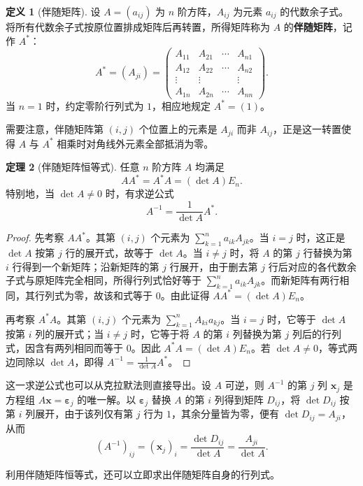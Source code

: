 \documentclass[UTF8, fontset=fandol, a4paper, 12pt]{ctexart}
\newcommand{\vx}{\boldsymbol{x}}
\newcommand{\ve}{\boldsymbol{\varepsilon}}
\theoremstyle{definition}
\newtheorem{definition}{定义}[section]
\newtheorem{theorem}[definition]{定理}
\begin{document}
\begin{definition}[伴随矩阵]
设 $A=(a_{ij})$ 为 $n$ 阶方阵，$A_{ij}$ 为元素 $a_{ij}$ 的代数余子式。将所有代数余子式按原位置排成矩阵后再转置，所得矩阵称为 $A$ 的\textbf{伴随矩阵}，记作 $A^*$：
\[
 A^*=(A_{ji})=
 \begin{pmatrix}
  A_{11}&A_{21}&\cdots&A_{n1}\\
  A_{12}&A_{22}&\cdots&A_{n2}\\
  \vdots&\vdots&&\vdots\\
  A_{1n}&A_{2n}&\cdots&A_{nn}
 \end{pmatrix}.
\]
当 $n=1$ 时，约定零阶行列式为 $1$，相应地规定 $A^*=(1)$。
\end{definition}

需要注意，伴随矩阵第 $(i,j)$ 个位置上的元素是 $A_{ji}$ 而非 $A_{ij}$，正是这一转置使得 $A$ 与 $A^*$ 相乘时对角线外元素全部抵消为零。

\begin{theorem}[伴随矩阵恒等式]\label{thm:adjugate}
任意 $n$ 阶方阵 $A$ 均满足
\[
 AA^*=A^*A=(\det A)E_n.
\]
特别地，当 $\det A\ne0$ 时，有求逆公式
\[
 A^{-1}=\frac{1}{\det A}A^*.
\]
\end{theorem}
\begin{proof}
先考察 $AA^*$。其第 $(i,j)$ 个元素为 $\sum_{k=1}^n a_{ik}A_{jk}$。当 $i=j$ 时，这正是 $\det A$ 按第 $j$ 行的展开式，故等于 $\det A$。当 $i\ne j$ 时，将 $A$ 的第 $j$ 行替换为第 $i$ 行得到一个新矩阵；沿新矩阵的第 $j$ 行展开，由于删去第 $j$ 行后对应的各代数余子式与原矩阵完全相同，所得行列式恰好等于 $\sum_{k=1}^n a_{ik}A_{jk}$。而新矩阵有两行相同，其行列式为零，故该和式等于 $0$。由此证得 $AA^*=(\det A)E_n$。

再考察 $A^*A$。其第 $(i,j)$ 个元素为 $\sum_{k=1}^n A_{ki}a_{kj}$。当 $i=j$ 时，它等于 $\det A$ 按第 $i$ 列的展开式；当 $i\ne j$ 时，它等于将 $A$ 的第 $i$ 列替换为第 $j$ 列后的行列式，因含有两列相同而等于 $0$。因此 $A^*A=(\det A)E_n$。若 $\det A\ne0$，等式两边同除以 $\det A$，即得 $A^{-1}=\frac{1}{\det A}A^*$。
\end{proof}

这一求逆公式也可以从克拉默法则直接导出。设 $A$ 可逆，则 $A^{-1}$ 的第 $j$ 列 $\boldsymbol{x}_j$ 是方程组 $A\vx=\ve_j$ 的唯一解。以 $\ve_j$ 替换 $A$ 的第 $i$ 列得到矩阵 $D_{ij}$，将 $\det D_{ij}$ 按第 $i$ 列展开，由于该列仅有第 $j$ 行为 $1$，其余分量皆为零，便有 $\det D_{ij}=A_{ji}$，从而
\[
 (A^{-1})_{ij}=(\boldsymbol{x}_j)_i=\frac{\det D_{ij}}{\det A}=\frac{A_{ji}}{\det A}.
\]

利用伴随矩阵恒等式，还可以立即求出伴随矩阵自身的行列式。
\end{document}
